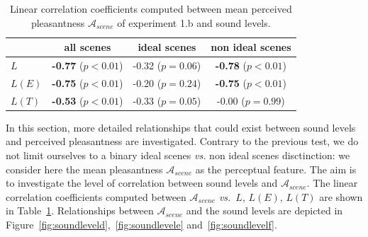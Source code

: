 \documentclass[12pt]{elsarticle}
\newcommand{\vs}{\emph{vs.}}
\begin{document}
\begin{table}[t]
\centering
\begin{tabular}{l c c c}
               & all scenes                & ideal scenes          & non ideal scenes    \\
\hline
$L$            & \textbf{-0.77} ($p<0.01$) & -0.32 ($p=0.06$)  & \textbf{-0.78} ($p<0.01$)\\
$L(E)$         & \textbf{-0.75} ($p<0.01$) & -0.20 ($p=0.24$)  & \textbf{-0.75} ($p<0.01$)\\
$L(T)$         & \textbf{-0.53} ($p<0.01$) & -0.33 ($p=0.05$)  &  -0.00 ($p=0.99$) \\
\hline
\end{tabular}
\vspace{0.5mm}
\caption{Linear correlation coefficients computed between mean perceived pleasantness $\mathcal{A}_{scene}$ of experiment 1.b and sound levels.}
\label{tab:corrStructA}
\end{table}


In this section, more detailed relationships that could exist between sound levels and perceived pleasantness are investigated. Contrary to the previous test, we do not limit ourselves to a binary ideal scenes \emph{vs.} non ideal scenes disctinction: we consider here the mean pleasantness $\mathcal{A}_{scene}$ as the perceptual feature. The aim is to investigate the level of correlation between sound levels and $\mathcal{A}_{scene}$. The linear correlation coefficients computed between $\mathcal{A}_{scene}$ \vs~$L$, $L(E)$, $L(T)$ are shown in Table~\ref{tab:corrStructA}. Relationships between $\mathcal{A}_{scene}$ and the sound levels are depicted in Figure~\ref{fig:soundleveld},~\ref{fig:soundlevele} and~\ref{fig:soundlevelf}.
\end{document}
